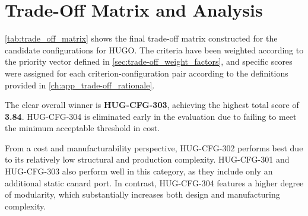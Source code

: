 \section{Trade-Off Matrix and Analysis}
\label{sec:trade-off_matrix}

\autoref{tab:trade_off_matrix} shows the final trade-off matrix constructed for the candidate configurations for HUGO. The criteria have been weighted according to the priority vector defined in \autoref{sec:trade-off_weight_factors}, and specific scores were assigned for each criterion-configuration pair according to the definitions provided in \autoref{ch:app_trade-off_rationale}. %

The clear overall winner is \textbf{HUG-CFG-303}, achieving the highest total score of \textbf{3.84}. HUG-CFG-304 is eliminated early in the evaluation due to failing to meet the minimum acceptable threshold in cost.

From a cost and manufacturability perspective, HUG-CFG-302 performs best due to its relatively low structural and production complexity. HUG-CFG-301 and HUG-CFG-303 also perform well in this category, as they include only an additional static canard port. In contrast, HUG-CFG-304 features a higher degree of modularity, which substantially increases both design and manufacturing complexity.

